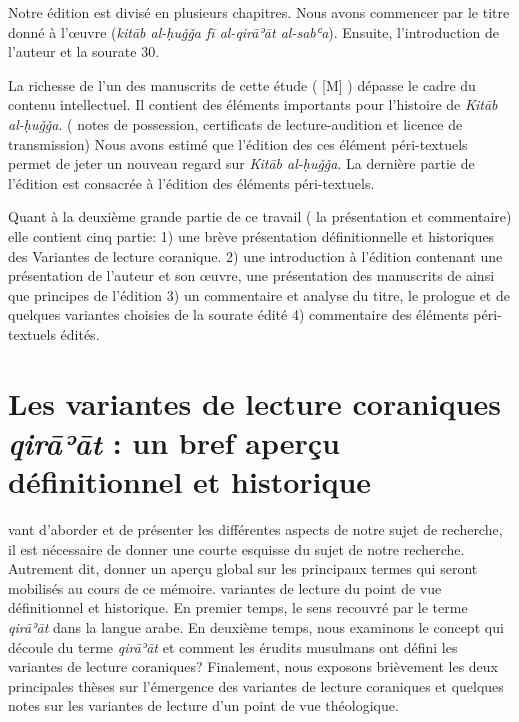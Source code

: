 \documentclass[a4paper,12pt]{report}
\begin{document}
\begin{itemize}
Notre  édition est divisé en plusieurs chapitres. Nous avons commencer par le titre donné à  l'œuvre (\textit{kitāb al-ḥuǧǧa f\=i al-qirāʾāt al-sabʿa}).   Ensuite, l'introduction de l'auteur et la sourate 30. 

La richesse de l'un des  manuscrits de cette étude  ( [M] ) dépasse le cadre du contenu intellectuel. Il contient des éléments importants pour l'histoire de  \textit{Kitāb al-ḥuǧǧa}.  (  notes de  possession, certificats de lecture-audition et licence de transmission)  Nous avons estimé que l'édition des ces élément péri-textuels permet de jeter un nouveau regard  sur   \textit{Kitāb al-ḥuǧǧa}. La dernière partie de l'édition est consacrée à l'édition des éléments péri-textuels.      


Quant à la deuxième grande  partie de ce travail   ( la présentation et commentaire)  
elle contient cinq partie: 1) une brève présentation définitionnelle et historiques des Variantes de lecture coranique.  2) une introduction à l'édition contenant une présentation de l'auteur et son œuvre, une présentation des manuscrits de   ainsi que  principes de l'édition     3) un commentaire et analyse du titre, le prologue et  de quelques variantes choisies de la sourate édité  4)  commentaire des éléments péri-textuels édités.   
 
  





\chapter{Les variantes de lecture coraniques \textit{qirāʾāt} : un  bref aperçu définitionnel et historique}


 
vant d'aborder et de présenter les différentes aspects de notre sujet de recherche, il est nécessaire de  donner une  courte esquisse du sujet de notre recherche. Autrement dit, donner un aperçu global sur les  principaux termes qui seront mobilisés au cours de ce mémoire. variantes de lecture du point de vue  définitionnel et historique. En premier temps, le sens recouvré par le terme \textit{qirāʾāt} dans la langue arabe. En deuxième temps, nous examinons le concept  qui découle du terme \textit{qirāʾāt} et comment les érudits musulmans ont défini les variantes de lecture coraniques? Finalement, nous exposons brièvement les deux principales thèses sur l'émergence des variantes de lecture coraniques et quelques notes sur les variantes de lecture d'un point de vue théologique. 


\end{itemize}
\end{document}
